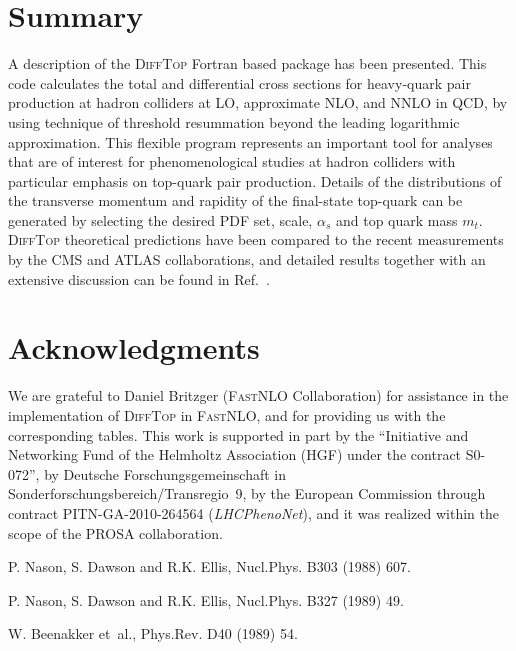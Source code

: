 \documentclass[11pt]{article}
\begin{document}
{\section{Summary}\label{sec:Summary}

A description of the \textsc{DiffTop} Fortran based package has been presented.
This code calculates the total and differential cross sections 
for heavy-quark pair production 
at hadron colliders at LO, approximate NLO, and NNLO in QCD, 
by using technique of threshold resummation beyond the leading logarithmic approximation.
This flexible program represents an important tool for
analyses that are of interest for phenomenological 
studies at hadron colliders with particular emphasis on top-quark pair production. 
Details of the distributions of the transverse momentum and rapidity of the 
final-state top-quark can be generated by selecting the desired PDF set, scale, $\alpha_s$ 
and top quark mass $m_t$. 
\textsc{DiffTop} theoretical predictions have been compared to the recent measurements 
by the CMS and ATLAS collaborations, and detailed results together with an 
extensive discussion can be found in Ref.~\cite{Guzzi:2014wia}.




\section*{Acknowledgments}

We are grateful to Daniel Britzger (\textsc{FastNLO} Collaboration) for assistance 
in the implementation of \textsc{DiffTop} in \textsc{FastNLO}, 
and for providing us with the corresponding tables.
This work is supported in part by the 
``Initiative and Networking Fund of the Helmholtz Association (HGF) under the contract S0-072'',
by Deutsche Forschungsgemeinschaft in Sonderforschungs\-be\-reich/Transregio~9, 
by the European Commission through contract PITN-GA-2010-264564 ({\it LHCPhenoNet}), 
and it was realized within the scope of the PROSA collaboration.



\begin{thebibliography}{10}

P. Nason, S. Dawson and R.K. Ellis,
\newblock Nucl.Phys. B303 (1988) 607.

P. Nason, S. Dawson and R.K. Ellis,
\newblock Nucl.Phys. B327 (1989) 49.

W. Beenakker et~al.,
\newblock Phys.Rev. D40 (1989) 54.


\end{thebibliography}}
\end{document}
